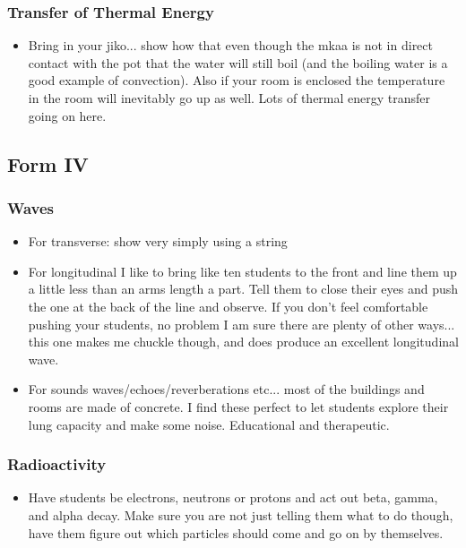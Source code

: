  \subsubsection{Transfer of Thermal Energy}
\begin{itemize}
\item	Bring in your jiko... show how that even though the mkaa is not in direct contact with the pot that the water will still boil (and the boiling water is a good example of convection). Also if your room is enclosed the temperature in the room will inevitably go up as well. Lots of thermal energy transfer going on here. 
\end{itemize}

 
\subsection{Form IV}
 \subsubsection{Waves}
\begin{itemize}
\item	For transverse: show very simply using a string
\item	For longitudinal I like to bring like ten students to the front and line them up a little less than an arms length a part. Tell them to close their eyes and push the one at the back of the line and observe. If you don't feel comfortable pushing your students, no problem I am sure there are plenty of other ways... this one makes me chuckle though, and does produce an excellent longitudinal wave. 
\item	For sounds waves/echoes/reverberations etc... most of the buildings and rooms are made of concrete. I find these perfect to let students explore their lung capacity and make some noise. Educational and therapeutic. 
\end{itemize}

 \subsubsection{Radioactivity}
\begin{itemize}
\item	Have students be electrons, neutrons or protons and act out beta, gamma, and alpha decay. Make sure you are not just telling them what to do though, have them figure out which particles should come and go on by themselves. 
\end{itemize}

